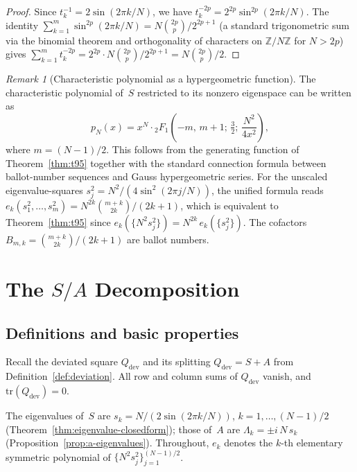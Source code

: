 \documentclass[aip,jmp,reprint,superscriptaddress,floatfix,nofootinbib]{revtex4-2}
\theoremstyle{definition}
\theoremstyle{remark}
\newtheorem{remark}[theorem]{Remark}
\begin{document}
\begin{proof}
Since $t_k^{-1} = 2\sin(2\pi k/N)$, we have
$t_k^{-2p} = 2^{2p}\sin^{2p}(2\pi k/N)$.
The identity $\sum_{k=1}^{m}\sin^{2p}(2\pi k/N) = N\binom{2p}{p}/2^{2p+1}$
(a standard trigonometric sum via the binomial theorem and
orthogonality of characters on $\mathbb{Z}/N\mathbb{Z}$ for $N > 2p$)
gives $\sum_{k=1}^{m} t_k^{-2p} = 2^{2p}\cdot N\binom{2p}{p}/2^{2p+1}
= N\binom{2p}{p}/2$.
\end{proof}

\begin{remark}[Characteristic polynomial as a hypergeometric function]
\label{rem:charpoly-hyp}
The characteristic polynomial of~$S$ restricted to its nonzero eigenspace
can be written as
\begin{equation}\label{eq:charpoly-hyp}
  p_N(x)
  = x^N\cdot {}_2F_1\!\left(-m,\,m+1;\,\tfrac{3}{2};\,\frac{N^2}{4x^2}\right),
\end{equation}
where $m = (N{-}1)/2$.
This follows from the generating function of Theorem~\ref{thm:t95}
together with the standard connection formula between ballot-number sequences
and Gauss hypergeometric series.
For the unscaled eigenvalue-squares $s_j^2 = N^2/(4\sin^2(2\pi j/N))$,
the unified formula reads
$e_k(s_1^2,\ldots,s_m^2) = N^{2k}\binom{m+k}{2k}/(2k+1)$,
which is equivalent to Theorem~\ref{thm:t95} since
$e_k(\{N^2 s_j^2\}) = N^{2k}\,e_k(\{s_j^2\})$.
The cofactors $B_{m,k} = \binom{m+k}{2k}/(2k+1)$ are ballot numbers.
\end{remark}

\section{The \texorpdfstring{$S/A$}{S/A} Decomposition}
\label{sec:sa-decomposition}

\subsection{Definitions and basic properties}

Recall the deviated square $Q_{\mathrm{dev}}$ and its splitting
$Q_{\mathrm{dev}} = S + A$ from Definition~\ref{def:deviation}.
All row and column sums of $Q_{\mathrm{dev}}$ vanish, and
$\mathrm{tr}(Q_{\mathrm{dev}}) = 0$.

\noindent
The eigenvalues of~$S$ are $s_k = N/(2\sin(2\pi k/N))$,
$k=1,\ldots,(N{-}1)/2$ (Theorem~\ref{thm:eigenvalue-closedform});
those of~$A$ are $\Lambda_k = \pm i\,N\,s_k$
(Proposition~\ref{prop:a-eigenvalues}).
Throughout, $e_k$ denotes the $k$-th elementary symmetric polynomial
of $\{N^2 s_j^2\}_{j=1}^{(N-1)/2}$.
\end{document}
